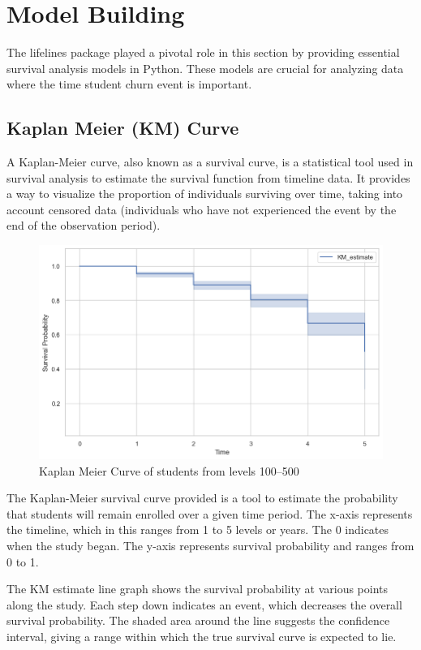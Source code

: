 \documentclass[12pt]{report}
\begin{document}
	
	\section{Model Building}
	
	The lifelines package played a pivotal role in this section by providing essential survival analysis models in Python. These models are crucial for analyzing data where the time student churn event is important. 
	
	
	\subsection{Kaplan Meier (KM) Curve}
	
	A Kaplan-Meier curve, also known as a survival curve, is a statistical tool used in survival analysis to estimate the survival function from timeline data. It provides a way to visualize the proportion of individuals surviving over time, taking into account censored data (individuals who have not experienced the event by the end of the observation period).
	\begin{figure}[H]
		\centering
		\includegraphics[width=1\linewidth]{Figure 4/4.1.png}
		\caption{Kaplan Meier Curve of students from levels 100–500}
	\end{figure}
	
	The Kaplan-Meier survival curve provided is a tool to estimate the probability that students will remain enrolled over a given time period. The x-axis represents the timeline, which in this ranges from 1 to 5 levels or years. The 0 indicates when the study began. The y-axis represents survival probability and ranges from 0 to 1.
	
	
	The KM estimate line graph shows the survival probability at various points along the study. Each step down indicates an event, which decreases the overall survival probability. The shaded area around the line suggests the confidence interval, giving a range within which the true survival curve is expected to lie.
	
\end{document}
